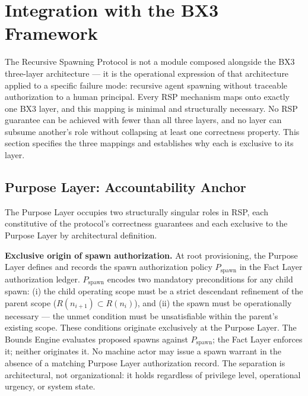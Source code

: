 \section{Integration with the BX3 Framework}
\label{sec:bx3_integration}

\newcommand{\purus}{\texttt{Purpose Layer}}
\newcommand{\bounds}{\texttt{Bounds Engine}}
\newcommand{\fact}{\texttt{Fact Layer}}

The Recursive Spawning Protocol is not a module composed alongside the BX3 three-layer architecture --- it is the operational expression of that architecture applied to a specific failure mode: recursive agent spawning without traceable authorization to a human principal. Every RSP mechanism maps onto exactly one BX3 layer, and this mapping is minimal and structurally necessary. No RSP guarantee can be achieved with fewer than all three layers, and no layer can subsume another's role without collapsing at least one correctness property. This section specifies the three mappings and establishes why each is exclusive to its layer.

\subsection{Purpose Layer: Accountability Anchor}
\label{sec:purpose_anchor}

The Purpose Layer occupies two structurally singular roles in RSP, each constitutive of the protocol's correctness guarantees and each exclusive to the Purpose Layer by architectural definition.

\medskip
\noindent\textbf{Exclusive origin of spawn authorization.} At root provisioning, the Purpose Layer defines and records the spawn authorization policy $P_{\mathrm{spawn}}$ in the Fact Layer authorization ledger. $P_{\mathrm{spawn}}$ encodes two mandatory preconditions for any child spawn: (i) the child operating scope must be a strict descendant refinement of the parent scope ($R(n_{i+1}) \subset R(n_i)$), and (ii) the spawn must be operationally necessary --- the unmet condition must be unsatisfiable within the parent's existing scope. These conditions originate exclusively at the Purpose Layer. The Bounds Engine evaluates proposed spawns against $P_{\mathrm{spawn}}$; the Fact Layer enforces it; neither originates it. No machine actor may issue a spawn warrant in the absence of a matching Purpose Layer authorization record. The separation is architectural, not organizational: it holds regardless of privilege level, operational urgency, or system state.

